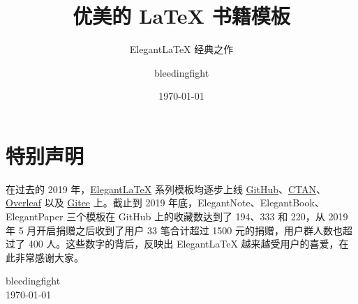 \documentclass[cn,11pt,chinese]{elegantbook}
\title{优美的 \LaTeX{} 书籍模板}
\subtitle{Elegant\LaTeX{} 经典之作}
\author{bleedingfight}
\institute{Elegant\LaTeX{} Program}
\date{\today}
\begin{document}
\maketitle
\frontmatter

\chapter*{特别声明}

在过去的 2019 年，\href{https://elegantlatex.org/}{Elegant\LaTeX{}} 系列模板均逐步上线 \href{https://github.com/ElegantLaTeX}{GitHub}、\href{https://ctan.org/pkg/elegantbook}{CTAN}、\href{https://www.overleaf.com/latex/templates/elegantbook-template/zpsrbmdsxrgy}{Overleaf} 以及 \href{https://gitee.com/ElegantLaTeX/ElegantBook}{Gitee} 上。截止到 2019 年底，ElegantNote、ElegantBook、ElegantPaper 三个模板在 GitHub 上的收藏数达到了 194、333 和 220，从 2019 年 5 月开启捐赠之后收到了用户 33 笔合计超过 1500 元的捐赠，用户群人数也超过了 400 人。这些数字的背后，反映出 Elegant\LaTeX{} 越来越受用户的喜爱，在此非常感谢大家。
\vskip 1.5cm

\begin{flushright}
bleedingfight\\
\today
\end{flushright}

\tableofcontents
\listoflistings

\mainmatter

\end{document}
